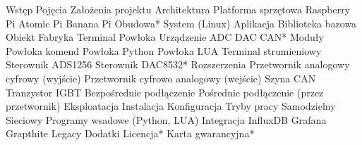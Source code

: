 Wstęp
    Pojęcia
    Założenia projektu
Architektura
    Platforma sprzętowa
        Raspberry Pi
        Atomic Pi
        Banana Pi
        Obudowa*
    System (Linux)
    Aplikacja
        Biblioteka bazowa
            Obiekt
                Fabryka
                Terminal
                Powłoka
                Urządzenie
                    ADC
                    DAC
                    CAN*
        Moduły
            Powłoka komend
            Powłoka Python
            Powłoka LUA
            Terminal strumieniowy
            Sterownik ADS1256
            Sterownik DAC8532*
Rozszerzenia
    Przetwornik analogowy cyfrowy (wyjście)
    Przetwornik cyfrowo analogowy (wejście)
    Szyna CAN
    Tranzystor IGBT
        Bezpośrednie podłączenie
        Pośrednie podłączenie (przez przetwornik)
Eksploatacja
    Instalacja
    Konfiguracja
        Tryby pracy
            Samodzielny
            Sieciowy
        Programy wsadowe (Python, LUA)
    Integracja
        InfluxDB
        Grafana
        Grapthite
        Legacy
Dodatki
    Licencja*
    Karta gwarancyjna*

